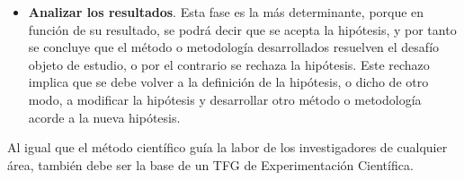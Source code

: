 \begin{itemize}
    \item \textbf{Analizar los resultados}. Esta fase es la más determinante, porque en función de su resultado, se podrá decir que se acepta la hipótesis, y por tanto se concluye que el método o metodología desarrollados resuelven el desafío objeto de estudio, o por el contrario se rechaza la hipótesis. Este rechazo implica que se debe volver a la definición de la hipótesis, o dicho de otro modo, a modificar la hipótesis y desarrollar otro método o metodología acorde a la nueva hipótesis.
\end{itemize}

Al igual que el método científico guía la labor de los investigadores de cualquier área, también debe ser la base de un TFG de Experimentación Científica.



